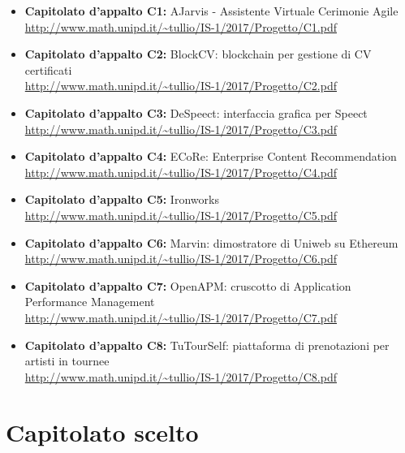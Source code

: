 \documentclass[openany,12pt,a4paper]{report}
\begin{document}
	\begin{itemize}
		\item \textbf{Capitolato d'appalto C1:} AJarvis - Assistente Virtuale Cerimonie Agile \\ \url{http://www.math.unipd.it/~tullio/IS-1/2017/Progetto/C1.pdf}
		
		\item \textbf{Capitolato d'appalto C2:} BlockCV: blockchain per gestione di CV certificati \\ \url{http://www.math.unipd.it/~tullio/IS-1/2017/Progetto/C2.pdf}
		
		\item \textbf{Capitolato d'appalto C3:} DeSpeect: interfaccia grafica per Speect \\ \url{http://www.math.unipd.it/~tullio/IS-1/2017/Progetto/C3.pdf}
		
		\item \textbf{Capitolato d'appalto C4:} ECoRe: Enterprise Content Recommendation \\ \url{http://www.math.unipd.it/~tullio/IS-1/2017/Progetto/C4.pdf}
		
		\item \textbf{Capitolato d'appalto C5:} Ironworks \\ \url{http://www.math.unipd.it/~tullio/IS-1/2017/Progetto/C5.pdf}
		
		\item \textbf{Capitolato d'appalto C6:} Marvin: dimostratore di Uniweb su Ethereum \\ \url{http://www.math.unipd.it/~tullio/IS-1/2017/Progetto/C6.pdf}
		
		\item \textbf{Capitolato d'appalto C7:} OpenAPM: cruscotto di Application Performance Management \\ \url{http://www.math.unipd.it/~tullio/IS-1/2017/Progetto/C7.pdf}
		
		\item \textbf{Capitolato d'appalto C8:} TuTourSelf: piattaforma di prenotazioni per artisti in tournee \\ \url{http://www.math.unipd.it/~tullio/IS-1/2017/Progetto/C8.pdf}
	\end{itemize}
	
	
	\chapter{Capitolato scelto}
	
\end{document}
